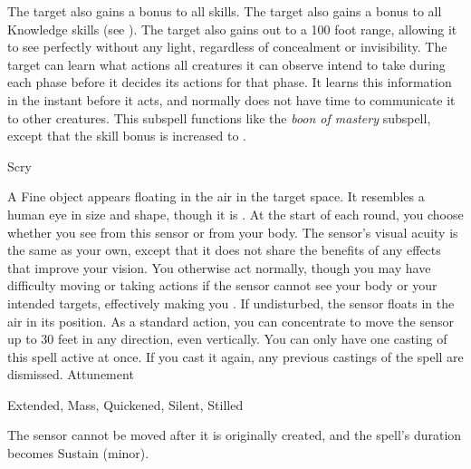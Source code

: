 The target also gains a  bonus to all skills.
The target also gains a  bonus to all Knowledge skills (see ).
The target also gains  out to a 100 foot range, allowing it to see perfectly without any light, regardless of concealment or invisibility.
The target can learn what actions all creatures it can observe intend to take during each phase before it decides its actions for that phase.
It learns this information in the instant before it acts, and normally does not have time to communicate it to other creatures.
This subspell functions like the \textit{boon of mastery} subspell, except that the skill bonus is increased to .
\begin{spellsection}{Scry}
\begin{spellheader}
\end{spellheader}
\begin{spellcontent}
\begin{spelltargetinginfo}
\end{spelltargetinginfo}
\begin{spelleffects}
\spelleffect
A Fine object appears floating in the air in the target space.
It resembles a human eye in size and shape, though it is .
At the start of each round, you choose whether you see from this sensor or from your body.
The sensor's visual acuity is the same as your own, except that it does not share the benefits of any  effects that improve your vision.
You otherwise act normally, though you may have difficulty moving or taking actions if the sensor cannot see your body or your intended targets, effectively making you \blinded.
If undisturbed, the sensor floats in the air in its position.
As a standard action, you can concentrate to move the sensor up to 30 feet in any direction, even vertically.
You can only have one casting of this spell active at once.
If you cast it again, any previous castings of the spell are dismissed.
\spelldur Attunement
\end{spelleffects}
\end{spellcontent}
\begin{spellfooter}
 Extended, Mass, Quickened, Silent, Stilled
\end{spellfooter}
\begin{spellsubcontent}
\begin{spellcantrip}
The sensor cannot be moved after it is originally created, and the spell's duration becomes Sustain (minor).
\end{spellcantrip}
\end{spellsubcontent}
\end{spellsection}
